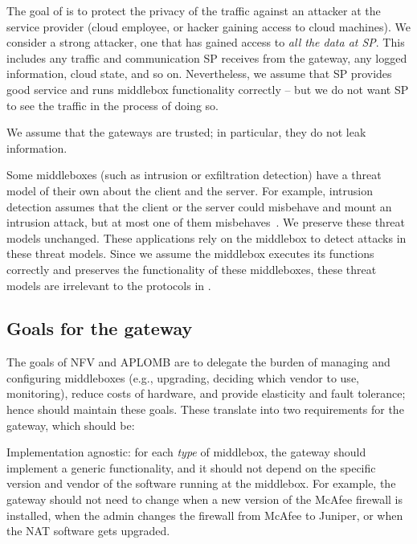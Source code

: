 The goal of \sys is to protect the privacy of the traffic against an attacker at the service provider  
(cloud employee, or hacker gaining access to cloud machines). 
We consider a strong  attacker, one that has gained access to {\em all the data at SP}.
This includes any traffic and communication SP receives from the 
gateway, any logged information, cloud state, and so on. Nevertheless, we assume that 
SP provides good service and runs middlebox functionality correctly -- but we do not want SP to 
see the traffic in the process of doing so.  

We assume that the gateways are trusted; in particular,  they do not leak information.


Some middleboxes (such as intrusion or exfiltration detection) have a threat model
of their own about the client and the server. For example, intrusion detection assumes that 
the client or the server could misbehave and mount an intrusion attack, but at most one of them misbehaves~\cite{Bro}.  
We preserve these threat models unchanged. These applications rely
on the middlebox to detect attacks in these threat models. Since we assume the middlebox executes
its functions correctly and \sys preserves the functionality of these middleboxes, 
these threat models are irrelevant to the protocols in \sys. %


\subsection{Goals for the gateway}

The goals of NFV and APLOMB are to delegate the burden of managing and configuring
middleboxes (e.g., upgrading, deciding which vendor to use, monitoring), reduce costs of hardware,
and provide elasticity and fault tolerance; hence \sys should maintain these goals.
%
These translate into two  requirements for the gateway, which should be: 

 Implementation agnostic: for each {\em type} of middlebox, the gateway should implement a generic functionality, and it should not depend on the specific version and vendor of the software running at the middlebox. For example, the gateway should not need to change when a new version of the McAfee firewall is installed, when the admin changes the firewall  from McAfee to Juniper, or when the NAT software gets upgraded. 

